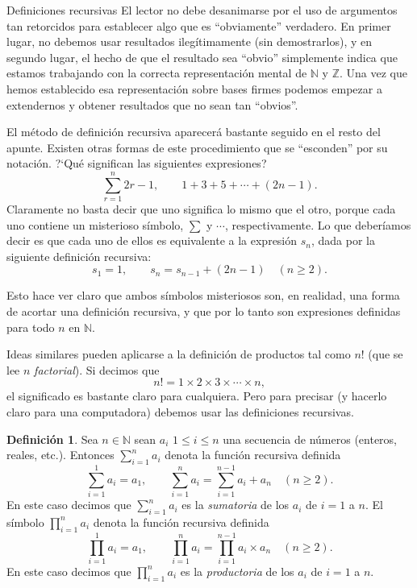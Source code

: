 \documentclass[11pt,spanish,makeidx]{amsbook}
\theoremstyle{definition}
\newtheorem{definicion}{Definici\'on}[section]
\theoremstyle{remark}
\newcommand \NN{{\mathbb N}}
\begin{document}
\begin{section}{Definiciones recursivas}
El lector no debe desanimarse por el uso de argumentos tan retorcidos para establecer algo que es ``obviamente'' verdadero. En primer lugar, no debemos usar resultados ilegítimamente (sin demostrarlos), y en segundo lugar, el hecho de que el resultado sea ``obvio'' simplemente indica que estamos trabajando con la correcta representación mental de $\mathbb N$ y $\mathbb Z$. Una vez que hemos establecido esa representación sobre bases firmes podemos empezar a extendernos y obtener resultados que no sean tan ``obvios''.

El método de definición recursiva aparecerá bastante seguido en el resto del apunte. Existen otras formas de este procedimiento que se ``esconden'' por su notación. ?`Qué significan las siguientes expresiones?
$$
\sum_{r=1}^{n} 2r-1,\qquad 1+3+5+\cdots +(2n-1).
$$
Claramente no basta decir que uno significa lo mismo que el otro, porque cada uno contiene un misterioso símbolo, $\sum$ y $\cdots$, respectivamente. Lo que deberíamos decir es que cada uno de ellos es equivalente a la expresión $s_n$, dada por la siguiente definición recursiva:
$$
s_1= 1, \qquad s_n = s_{n-1} +(2n-1) \quad (n\ge 2).
$$

Esto hace ver claro que ambos símbolos misteriosos son, en realidad, una forma de acortar una definición recursiva, y que por lo tanto son expresiones definidas para todo $n$ en $\mathbb N$.

Ideas similares pueden aplicarse a la definición de productos tal como $n!$ (que se lee $n$ {\it factorial}). Si decimos que
$$
n!=1 \times 2 \times 3 \times \cdots \times n,
$$
el significado es bastante claro para cualquiera. Pero para precisar (y hacerlo claro para una computadora) debemos usar las definiciones recursivas.

\begin{definicion} Sea $n \in \NN$ sean $a_i$  $1 \le i \le n$ una secuencia de números (enteros, reales, etc.). Entonces $\sum_{i=1}^{n} a_i$  denota la función recursiva definida  
	$$
	\sum_{i=1}^{1} a_i= a_1, \qquad \sum_{i=1}^{n} a_i = \sum_{i=1}^{n-1} a_i+ a_{n} \quad (n\ge 2).
	$$
	En  este caso  decimos que  $\sum_{i=1}^{n} a_i$ es la \textit{sumatoria} de los $a_i$ de $i=1$  a $n$. 
	El símbolo $\prod_{i=1}^{n} a_i$ denota la función recursiva definida  
	$$
	\prod_{i=1}^{1} a_i= a_1, \qquad \prod_{i=1}^{n} a_i = \prod_{i=1}^{n-1} a_i \times  a_{n} \quad (n\ge 2).
	$$
	En  este caso  decimos que  $\prod_{i=1}^{n} a_i$ es la \textit{productoria} de los $a_i$ de $i=1$  a $n$. 
\end{definicion}




\end{section}
\end{document}
